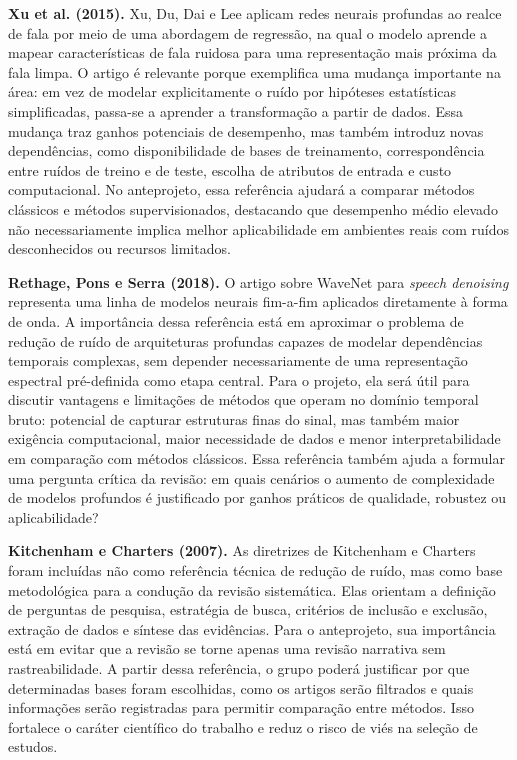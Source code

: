 \noindent\textbf{Xu et al. (2015).} Xu, Du, Dai e Lee aplicam redes neurais profundas ao realce de fala por meio de uma abordagem de regressão, na qual o modelo aprende a mapear características de fala ruidosa para uma representação mais próxima da fala limpa. O artigo é relevante porque exemplifica uma mudança importante na área: em vez de modelar explicitamente o ruído por hipóteses estatísticas simplificadas, passa-se a aprender a transformação a partir de dados. Essa mudança traz ganhos potenciais de desempenho, mas também introduz novas dependências, como disponibilidade de bases de treinamento, correspondência entre ruídos de treino e de teste, escolha de atributos de entrada e custo computacional. No anteprojeto, essa referência ajudará a comparar métodos clássicos e métodos supervisionados, destacando que desempenho médio elevado não necessariamente implica melhor aplicabilidade em ambientes reais com ruídos desconhecidos ou recursos limitados.

\noindent\textbf{Rethage, Pons e Serra (2018).} O artigo sobre WaveNet para \textit{speech denoising} representa uma linha de modelos neurais fim-a-fim aplicados diretamente à forma de onda. A importância dessa referência está em aproximar o problema de redução de ruído de arquiteturas profundas capazes de modelar dependências temporais complexas, sem depender necessariamente de uma representação espectral pré-definida como etapa central. Para o projeto, ela será útil para discutir vantagens e limitações de métodos que operam no domínio temporal bruto: potencial de capturar estruturas finas do sinal, mas também maior exigência computacional, maior necessidade de dados e menor interpretabilidade em comparação com métodos clássicos. Essa referência também ajuda a formular uma pergunta crítica da revisão: em quais cenários o aumento de complexidade de modelos profundos é justificado por ganhos práticos de qualidade, robustez ou aplicabilidade?

\noindent\textbf{Kitchenham e Charters (2007).} As diretrizes de Kitchenham e Charters foram incluídas não como referência técnica de redução de ruído, mas como base metodológica para a condução da revisão sistemática. Elas orientam a definição de perguntas de pesquisa, estratégia de busca, critérios de inclusão e exclusão, extração de dados e síntese das evidências. Para o anteprojeto, sua importância está em evitar que a revisão se torne apenas uma revisão narrativa sem rastreabilidade. A partir dessa referência, o grupo poderá justificar por que determinadas bases foram escolhidas, como os artigos serão filtrados e quais informações serão registradas para permitir comparação entre métodos. Isso fortalece o caráter científico do trabalho e reduz o risco de viés na seleção de estudos.

